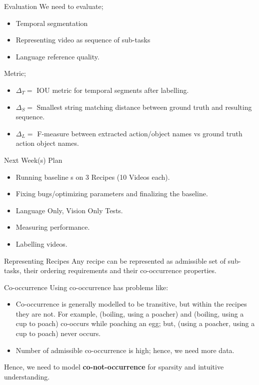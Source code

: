 \begin{frame}{Evaluation}
We need to evaluate;
\begin{itemize}
\item Temporal segmentation
\item Representing video as sequence of sub-tasks
\item Language reference quality.
\end{itemize}

Metric;
\begin{itemize}
\item $\Delta_T=$ IOU metric for temporal segments after labelling.
\item $\Delta_S=$ Smallest string matching distance between ground truth and resulting sequence. 
\item $\Delta_L=$ F-measure between extracted action/object names vs ground truth action object names.
\end{itemize}
\end{frame}

\begin{frame}{Next Week(s) Plan}
\begin{itemize}
\item Running baseline s on 3 Recipes (10 Videos each).
\item Fixing bugs/optimizing parameters and finalizing the baseline.
\item Language Only, Vision Only Tests.		
\item Measuring performance.
\item Labelling videos. 
\end{itemize}
\end{frame}

\begin{frame}{Representing Recipes}
Any recipe can be represented as admissible set of sub-tasks, their ordering requirements and their co-occurrence properties.
\end{frame}

\begin{frame}{Co-occurrence}
 Using co-occurrence has problems like:
\begin{itemize}
\item Co-occurrence is generally modelled to be transitive, but within the recipes they are not. For example, (boiling, using a poacher) and (boiling, using a cup to poach) co-occurs while poaching an egg; but, (using a poacher, using a cup to poach) never occurs.
\item Number of admissible co-occurrence is high; hence, we need more data.
\end{itemize}
Hence, we need to model {\bf co-not-occurrence} for sparsity and intuitive understanding.
\end{frame}

